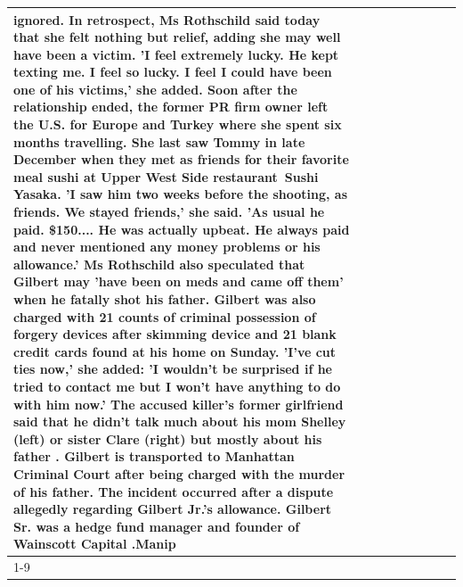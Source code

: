 \begin{table}[H]
\begin{tabular}{lllrlllll}
ignored. In retrospect, Ms Rothschild said today that she felt nothing but relief, adding she may well have been a victim. 'I feel extremely lucky. He kept texting me. I feel so lucky. I feel I could have been one of his victims,' she added. Soon after the relationship ended, the former PR firm owner left the U.S. for Europe and Turkey where she spent six months  travelling. She last saw Tommy in late December when they met as friends for their favorite meal sushi at Upper West Side restaurant Sushi Yasaka. 'I saw him two weeks before the shooting, as friends. We stayed friends,' she said. 'As usual he paid. \$150.... He was actually upbeat. He always paid and never mentioned any money problems or his allowance.' Ms Rothschild also speculated that Gilbert may 'have been on meds and came off them' when he fatally shot his father. Gilbert was also charged with 21 counts of criminal possession of forgery devices after skimming device and 21 blank credit cards found at his home on Sunday. 'I've cut ties now,' she added: 'I wouldn’t be surprised if he tried to contact me but I won’t have anything to do with him now.' The accused killer's former girlfriend said that he didn't talk much about his mom Shelley (left) or sister Clare (right) but mostly about his father . Gilbert is transported to Manhattan Criminal Court  after being charged with the murder of his father. The incident occurred after a dispute allegedly regarding Gilbert Jr.'s allowance. Gilbert Sr. was a hedge fund manager and founder of Wainscott Capital .Manip \\
\cline{1-9}

\end{tabular}
\end{table}
